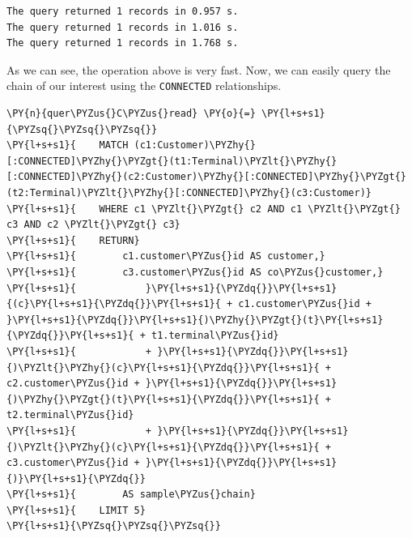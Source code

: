     \begin{Verbatim}[commandchars=\\\{\}]
The query returned 1 records in 0.957 s.
The query returned 1 records in 1.016 s.
The query returned 1 records in 1.768 s.
    \end{Verbatim}

    As we can see, the operation above is very fast. Now, we can easily
query the chain of our interest using the \texttt{CONNECTED}
relationships.

    \begin{tcolorbox}[breakable, size=fbox, boxrule=1pt, pad at break*=1mm,colback=cellbackground, colframe=cellborder]
\begin{Verbatim}[commandchars=\\\{\}]
\PY{n}{quer\PYZus{}C\PYZus{}read} \PY{o}{=} \PY{l+s+s1}{\PYZsq{}\PYZsq{}\PYZsq{}}
\PY{l+s+s1}{    MATCH (c1:Customer)\PYZhy{}[:CONNECTED]\PYZhy{}\PYZgt{}(t1:Terminal)\PYZlt{}\PYZhy{}[:CONNECTED]\PYZhy{}(c2:Customer)\PYZhy{}[:CONNECTED]\PYZhy{}\PYZgt{}(t2:Terminal)\PYZlt{}\PYZhy{}[:CONNECTED]\PYZhy{}(c3:Customer)}
\PY{l+s+s1}{    WHERE c1 \PYZlt{}\PYZgt{} c2 AND c1 \PYZlt{}\PYZgt{} c3 AND c2 \PYZlt{}\PYZgt{} c3}
\PY{l+s+s1}{    RETURN}
\PY{l+s+s1}{        c1.customer\PYZus{}id AS customer,}
\PY{l+s+s1}{        c3.customer\PYZus{}id AS co\PYZus{}customer,}
\PY{l+s+s1}{            }\PY{l+s+s1}{\PYZdq{}}\PY{l+s+s1}{(c}\PY{l+s+s1}{\PYZdq{}}\PY{l+s+s1}{ + c1.customer\PYZus{}id + }\PY{l+s+s1}{\PYZdq{}}\PY{l+s+s1}{)\PYZhy{}\PYZgt{}(t}\PY{l+s+s1}{\PYZdq{}}\PY{l+s+s1}{ + t1.terminal\PYZus{}id}
\PY{l+s+s1}{            + }\PY{l+s+s1}{\PYZdq{}}\PY{l+s+s1}{)\PYZlt{}\PYZhy{}(c}\PY{l+s+s1}{\PYZdq{}}\PY{l+s+s1}{ + c2.customer\PYZus{}id + }\PY{l+s+s1}{\PYZdq{}}\PY{l+s+s1}{)\PYZhy{}\PYZgt{}(t}\PY{l+s+s1}{\PYZdq{}}\PY{l+s+s1}{ + t2.terminal\PYZus{}id}
\PY{l+s+s1}{            + }\PY{l+s+s1}{\PYZdq{}}\PY{l+s+s1}{)\PYZlt{}\PYZhy{}(c}\PY{l+s+s1}{\PYZdq{}}\PY{l+s+s1}{ + c3.customer\PYZus{}id + }\PY{l+s+s1}{\PYZdq{}}\PY{l+s+s1}{)}\PY{l+s+s1}{\PYZdq{}}
\PY{l+s+s1}{        AS sample\PYZus{}chain}
\PY{l+s+s1}{    LIMIT 5}
\PY{l+s+s1}{\PYZsq{}\PYZsq{}\PYZsq{}}
\end{Verbatim}
\end{tcolorbox}

